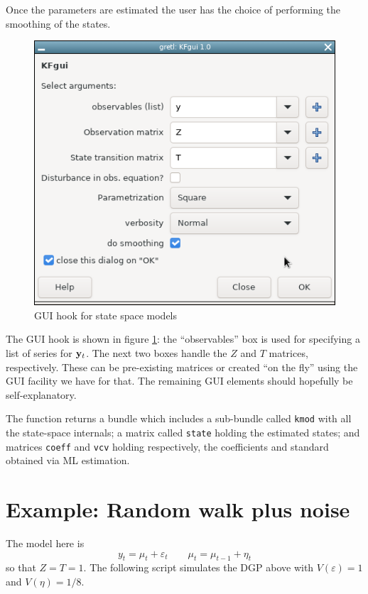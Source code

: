 \documentclass[a4paper]{article}
\newcommand{\obs}{\ensuremath\mathbf{y}_t}
\begin{document}
Once the parameters are estimated the user has the choice of
performing the smoothing of the states.

\begin{figure}[htbp]
  \centering
  \includegraphics[scale=0.5]{GUIScreenshot.png}
  \caption{GUI hook for state space models}
  \label{fig:GUI}
\end{figure}

The GUI hook is shown in figure \ref{fig:GUI}: the ``observables'' box
is used for specifying a list of series for $\obs$. The next two boxes
handle the $Z$ and $T$ matrices, respectively. These can be
pre-existing matrices or created ``on the fly'' using the GUI facility
we have for that. The remaining GUI elements should hopefully be
self-explanatory.

The function returns a bundle which includes a sub-bundle called
\texttt{kmod} with all the state-space internals; a matrix called
\texttt{state} holding the estimated states; and matrices
\texttt{coeff} and \texttt{vcv} holding respectively, the coefficients
and standard obtained via ML estimation.

\section*{Example: Random walk plus noise}

The model here is
\[
  y_t = \mu_t + \varepsilon_t \qquad \mu_t = \mu_{t-1} + \eta_t
\]
so that $Z = T = 1$. The following script simulates the DGP above
with $V(\varepsilon) = 1$ and $V(\eta) = 1/8$.
\end{document}
